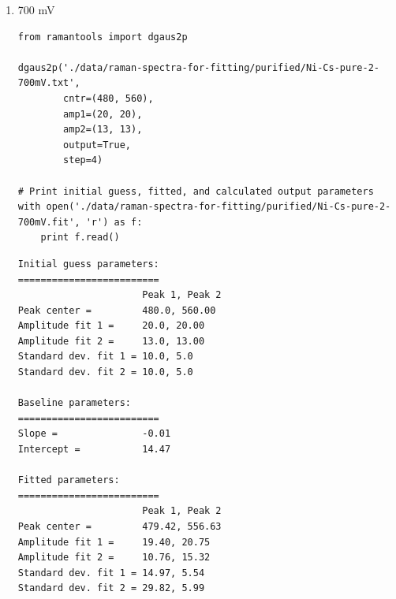 \documentclass[journal=jpccck,manuscript=suppinfo,email=true]{achemso}
\begin{document}
\begin{enumerate}
\begin{enumerate}
\begin{enumerate}
\begin{verbatim}
Initial guess parameters:
=========================
                      Peak 1, Peak 2
Peak center =         480.0, 560.00
Amplitude fit 1 =     20.0, 20.00
Amplitude fit 2 =     12.0, 12.00
Standard dev. fit 1 = 10.0, 5.0
Standard dev. fit 2 = 10.0, 5.0

Baseline parameters:
=========================
Slope =               -0.01
Intercept =           13.45

Fitted parameters:
=========================
                      Peak 1, Peak 2
Peak center =         479.03, 556.93
Amplitude fit 1 =     18.44, 20.50
Amplitude fit 2 =     10.46, 12.56
Standard dev. fit 1 = 15.94, 5.84
Standard dev. fit 2 = 28.43, 6.01

Calculation output:
========================
Mean peak 1 =         479.0 $\pm$ 0.14
Mean peak 2 =         556.9 $\pm$ 0.29
Height peak 1 =       46.9 $\pm$ 0.46
Height peak 2 =       30.0 $\pm$ 0.41
Area peak 1 =         1466.6
Area peak 2 =         1321.5
\end{verbatim}

\item 700 mV
\label{sec-4-1-0-2-2-2}
\begin{verbatim}
from ramantools import dgaus2p

dgaus2p('./data/raman-spectra-for-fitting/purified/Ni-Cs-pure-2-700mV.txt',
        cntr=(480, 560),
        amp1=(20, 20),
        amp2=(13, 13),
        output=True,
        step=4)

# Print initial guess, fitted, and calculated output parameters
with open('./data/raman-spectra-for-fitting/purified/Ni-Cs-pure-2-700mV.fit', 'r') as f:
    print f.read()
\end{verbatim}

\begin{verbatim}
Initial guess parameters:
=========================
                      Peak 1, Peak 2
Peak center =         480.0, 560.00
Amplitude fit 1 =     20.0, 20.00
Amplitude fit 2 =     13.0, 13.00
Standard dev. fit 1 = 10.0, 5.0
Standard dev. fit 2 = 10.0, 5.0

Baseline parameters:
=========================
Slope =               -0.01
Intercept =           14.47

Fitted parameters:
=========================
                      Peak 1, Peak 2
Peak center =         479.42, 556.63
Amplitude fit 1 =     19.40, 20.75
Amplitude fit 2 =     10.76, 15.32
Standard dev. fit 1 = 14.97, 5.54
Standard dev. fit 2 = 29.82, 5.99


\end{verbatim}
\end{enumerate}
\end{enumerate}
\end{enumerate}
\end{document}
